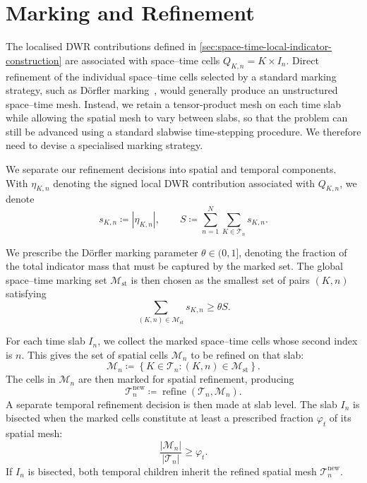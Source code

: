 \section{Marking and Refinement}
\label{sec:marking-refinement}

The localised DWR contributions defined in \cref{sec:space-time-local-indicator-construction} are associated with space--time cells \(Q_{K,n}=K\times I_n\). Direct refinement of the individual space--time cells selected by a standard marking strategy, such as D\"orfler marking~\cite{Dorfler1996}, would generally produce an unstructured space--time mesh. Instead, we retain a tensor-product mesh on each time slab while allowing the spatial mesh to vary between slabs, so that the problem can still be advanced using a standard slabwise time-stepping procedure. We therefore need to devise a specialised marking strategy. 

We separate our refinement decisions into spatial and temporal components. With \(\eta_{K,n}\) denoting the signed local DWR contribution associated with \(Q_{K,n}\), we denote
\begin{equation}
  s_{K,n}\coloneqq |\eta_{K,n}|,
  \qquad
  S\coloneqq
  \sum_{n=1}^{N}\sum_{K\in\mathcal T_n}s_{K,n}.
  \label{eq:marking-activity}
\end{equation}

We prescribe the D\"orfler marking parameter \(\theta\in(0,1]\), denoting the fraction of the total indicator mass that must be captured by the marked set. The global space--time marking set \(\mathcal M_{\mathrm{st}}\) is then chosen as the smallest set of pairs \((K,n)\) satisfying
\begin{equation}
  \sum_{(K,n)\in\mathcal M_{\mathrm{st}}}s_{K,n}
  \ge \theta S.
  \label{eq:space-time-dorfler}
\end{equation}

For each time slab \(I_n\), we collect the marked space--time cells whose second index is \(n\). This gives the set of spatial cells \(\mathcal M_n\) to be refined on that slab:
\begin{equation}
  \mathcal M_n
  \coloneqq
  \left\{
    K\in\mathcal T_n:
    (K,n)\in\mathcal M_{\mathrm{st}}
  \right\}.
  \label{eq:slabwise-marked-cells}
\end{equation}
The cells in \(\mathcal{M}_n\) are then marked for spatial refinement, producing
\begin{equation}
  \mathcal T_n^{\mathrm{new}}
  \coloneqq
  \operatorname{refine}(\mathcal T_n,\mathcal M_n).
  \label{eq:slabwise-spatial-refinement}
\end{equation}
A separate temporal refinement decision is then made at slab level. The slab \(I_n\) is bisected when the marked cells constitute at least a prescribed fraction \(\varphi_t\) of its spatial mesh:
\begin{equation}
  \frac{|\mathcal M_n|}{|\mathcal T_n|}
  \ge \varphi_t.
  \label{eq:within-slab-time-trigger}
\end{equation}
If \(I_n\) is bisected, both temporal children inherit the refined spatial mesh \(\mathcal T_n^{\mathrm{new}}\). 

